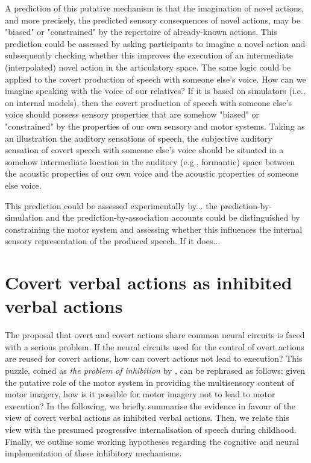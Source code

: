 \documentclass[utf8]{template/frontiersSCNS} %
\begin{document}
A prediction of this putative mechanism is that the imagination of novel actions, and more precisely, the predicted sensory consequences of novel actions, may be "biased" or "constrained" by the repertoire of already-known actions. This prediction could be assessed by asking participants to imagine a novel action and subsequently checking whether this improves the execution of an intermediate (interpolated) novel action in the articulatory space. The same logic could be applied to the covert production of speech with someone else’s voice. How can we imagine speaking with the voice of our relatives? If it is based on simulators (i.e., on internal models), then the covert production of speech with someone else’s voice should possess sensory properties that are somehow "biased" or "constrained" by the properties of our own sensory and motor systems. Taking as an illustration the auditory sensations of speech, the subjective auditory sensation of covert speech with someone else’s voice should be situated in a somehow intermediate location in the auditory (e.g., formantic) space between the acoustic properties of our own voice and the acoustic properties of someone else voice.

This prediction could be assessed experimentally by... the prediction-by-simulation and the prediction-by-association accounts could be distinguished by constraining the motor system and assessing whether this influences the internal sensory representation of the produced speech. If it does...

\section{Covert verbal actions as inhibited verbal actions}

The proposal that overt and covert actions share common neural circuits is faced with a serious problem. If the neural circuits used for the control of overt actions are reused for covert actions, how can covert actions not lead to execution? This puzzle, coined as \textit{the problem of inhibition} by \cite{jeannerod_neural_2001}, can be rephrased as follows: given the putative role of the motor system in providing the multisensory content of motor imagery, how is it possible for motor imagery not to lead to motor execution? In the following, we briefly summarise the evidence in favour of the view of covert verbal actions as inhibited verbal actions. Then, we relate this view with the presumed progressive internalisation of speech during childhood. Finally, we outline some working hypotheses regarding the cognitive and neural implementation of these inhibitory mechanisms.
\end{document}
